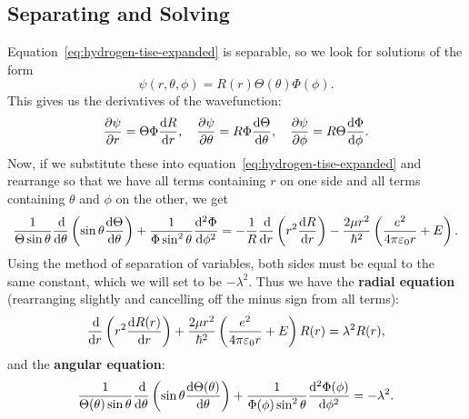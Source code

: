 \documentclass[../quantum_mechanics.tex]{subfiles}
\begin{document}
        \subsection{Separating and Solving}\label{sec:hydrogen-hamiltonian:subsec:separating-and-solving}
            Equation~\ref{eq:hydrogen-tise-expanded} is separable, so we look for solutions of the form
            \begin{equation}
                \psi(r,\theta,\phi)=R(r)\Theta(\theta)\Phi(\phi).
            \end{equation}
            This gives us the derivatives of the wavefunction:
            \begin{equation}
                \pdv{\psi}{r}=\Theta\Phi\dv{R}{r},\quad\pdv{\psi}{\theta}=R\Phi\dv{\Theta}{\theta},\quad\pdv{\psi}{\phi}=R\Theta\dv{\Phi}{\phi}.
            \end{equation}
            Now, if we substitute these into equation~\ref{eq:hydrogen-tise-expanded} and rearrange so that we have all terms containing $r$ on one side and all terms containing $\theta$ and $\phi$ on the other, we get
            \begin{equation}
                \frac{1}{\Theta\sin\theta}\dv{}{\theta}\left(\sin\theta\dv{\Theta}{\theta}\right)+\frac{1}{\Phi\sin^2\theta}\dv[2]{\Phi}{\phi}=-\frac{1}{R}\dv{}{r}\left(r^2\dv{R}{r}\right)-\frac{2\mu r^2}{\hbar^2}\left(\frac{e^2}{4\pi\varepsilon_0 r}+E\right).
            \end{equation}
            Using the method of separation of variables, both sides must be equal to the same constant, which we will set to be $-\lambda^2$.
            Thus we have the \textbf{radial equation} (rearranging slightly and cancelling off the minus sign from all terms):
            \begin{equation}\label{eq:hydrogen-tise-radial}
                \dv{}{r}\left(r^2\dv{R(r)}{r}\right)+\frac{2\mu r^2}{\hbar^2}\left(\frac{e^2}{4\pi\varepsilon_0 r}+E\right)R(r)=\lambda^2R(r),
            \end{equation}
            and the \textbf{angular equation}:
            \begin{equation}\label{eq:hydrogen-tise-angular}
                \frac{1}{\Theta(\theta)\sin\theta}\dv{}{\theta}\left(\sin\theta\dv{\Theta(\theta)}{\theta}\right)+\frac{1}{\Phi(\phi)\sin^2\theta}\dv[2]{\Phi(\phi)}{\phi}=-\lambda^2.
            \end{equation}
\end{document}
